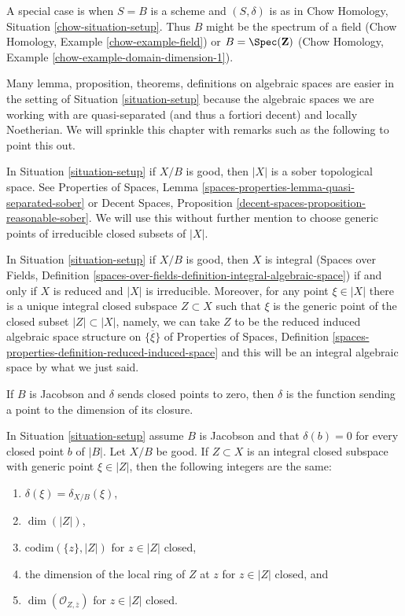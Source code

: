 \noindent
A special case is when $S = B$ is a scheme and $(S, \delta)$ is as in
Chow Homology, Situation \ref{chow-situation-setup}. Thus $B$ might be
the spectrum of a field (Chow Homology, Example \ref{chow-example-field})
or $B = \Spec(\mathbf{Z})$
(Chow Homology, Example \ref{chow-example-domain-dimension-1}).

\medskip\noindent
Many lemma, proposition, theorems, definitions on algebraic spaces
are easier in the setting of Situation \ref{situation-setup} because
the algebraic spaces we are working with are quasi-separated
(and thus a fortiori decent) and locally Noetherian. We will sprinkle
this chapter with remarks such as the following to point this out.

\begin{remark}
\label{remark-sober}
In Situation \ref{situation-setup} if $X/B$ is good, then
$|X|$ is a sober topological space. See
Properties of Spaces, Lemma \ref{spaces-properties-lemma-quasi-separated-sober}
or Decent Spaces, Proposition \ref{decent-spaces-proposition-reasonable-sober}.
We will use this without further mention
to choose generic points of irreducible closed subsets of $|X|$.
\end{remark}

\begin{remark}
\label{remark-integral}
In Situation \ref{situation-setup} if $X/B$ is good, then
$X$ is integral (Spaces over Fields, Definition
\ref{spaces-over-fields-definition-integral-algebraic-space})
if and only if $X$ is reduced and $|X|$ is irreducible.
Moreover, for any point $\xi \in |X|$ there is a unique integral closed
subspace $Z \subset X$ such that $\xi$ is the generic point
of the closed subset $|Z| \subset |X|$, namely, we can take
$Z$ to be the reduced induced algebraic space structure on
$\overline{\{\xi\}}$ of Properties of Spaces, Definition
\ref{spaces-properties-definition-reduced-induced-space}
and this will be an integral algebraic space by what we just said.
\end{remark}

\noindent
If $B$ is Jacobson and $\delta$ sends closed points to zero, then $\delta$
is the function sending a point to the dimension of its closure.

\begin{lemma}
\label{lemma-delta-is-dimension}
In Situation \ref{situation-setup} assume $B$ is Jacobson
and that $\delta(b) = 0$ for every closed point $b$ of $|B|$.
Let $X/B$ be good. If $Z \subset X$ is an integral closed subspace
with generic point $\xi \in |Z|$, then the following integers are the same:
\begin{enumerate}
\item $\delta(\xi) = \delta_{X/B}(\xi)$,
\item $\dim(|Z|)$,
\item $\text{codim}(\{z\}, |Z|)$ for $z \in |Z|$ closed,
\item the dimension of the local ring of $Z$ at $z$ for
$z \in |Z|$ closed, and
\item $\dim(\mathcal{O}_{Z, \overline{z}})$ for $z \in |Z|$ closed.
\end{enumerate}
\end{lemma}

